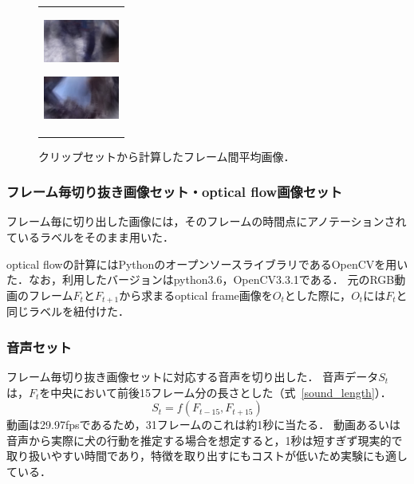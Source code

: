 \begin{figure}[htbp]
\begin{center}
\begin{tabular}{c}
\begin{minipage}{0.18\hsize}
\begin{center}
        \end{center}
      \end{minipage}
      \begin{minipage}{0.18\hsize}
        \begin{center}
          \includegraphics[clip, width=2.5cm]{./Figures/resque_mean1.eps}
          \hspace{0.1cm} { }
        \end{center}
      \end{minipage}
      \begin{minipage}{0.18\hsize}
        \begin{center}
          \includegraphics[clip, width=2.5cm]{./Figures/resque_mean5.eps}
          \hspace{0.2cm} { }
        \end{center}
      \end{minipage}
    \end{tabular}
    \caption{クリップセットから計算したフレーム間平均画像．}
    \label{resque_mean}
  \end{center}
\end{figure}

\subsubsection{フレーム毎切り抜き画像セット・optical flow画像セット}
フレーム毎に切り出した画像には，そのフレームの時間点にアノテーションされているラベルをそのまま用いた．

optical flowの計算にはPythonのオープンソースライブラリであるOpenCVを用いた．なお，利用したバージョンはpython3.6，OpenCV3.3.1である．
元のRGB動画のフレーム$F_t$と$F_{t+1}$から求まるoptical frame画像を$O_t$とした際に，$O_t$には$F_t$と同じラベルを紐付けた．


\subsubsection{音声セット}
フレーム毎切り抜き画像セットに対応する音声を切り出した．
音声データ$S_t$は，$F_t$を中央において前後15フレーム分の長さとした（式~\ref{sound_length}）．
\[S_t = f(F_{t-15}, F_{t+15}) \label{sound_length}\]
動画は29.97fpsであるため，31フレームのこれは約1秒に当たる．
動画あるいは音声から実際に犬の行動を推定する場合を想定すると，1秒は短すぎず現実的で取り扱いやすい時間であり，特徴を取り出すにもコストが低いため実験にも適している．


